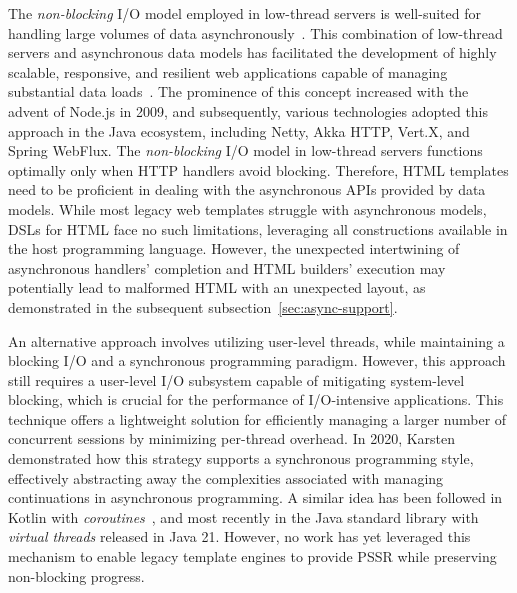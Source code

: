 The \textit{non-blocking} I/O model employed in low-thread servers is
well-suited for handling large volumes of data asynchronously~\cite{Meijer12}.
This combination of low-thread servers and asynchronous data models has
facilitated the development of highly scalable, responsive, and resilient web
applications capable of managing substantial data loads~\cite{Jin15}.
The prominence of this concept increased with the advent of Node.js in
2009, and subsequently, various technologies adopted this approach
in the Java ecosystem, including Netty, Akka HTTP, Vert.X, and Spring WebFlux.
The \textit{non-blocking} I/O model in low-thread servers functions optimally
only when HTTP handlers avoid blocking.
Therefore, HTML templates need to be proficient in dealing with the asynchronous
APIs provided by data models.
While most legacy web templates struggle with asynchronous models, DSLs for HTML
face no such limitations, leveraging all constructions available in the host
programming language.
However, the unexpected intertwining of asynchronous handlers' completion and
HTML builders' execution may potentially lead to malformed HTML with an
unexpected layout, as demonstrated in the subsequent subsection~\ref{sec:async-support}.

An alternative approach involves utilizing user-level threads, while maintaining
a blocking I/O and a synchronous programming paradigm.
However, this approach still requires a user-level I/O subsystem capable of
mitigating system-level blocking, which is crucial for the performance of
I/O-intensive applications. This technique offers a lightweight solution for
efficiently managing a larger number of concurrent sessions by minimizing
per-thread overhead.
In 2020, Karsten~\cite{karsten2020} demonstrated how this strategy supports a
synchronous programming style, effectively abstracting away the complexities
associated with managing continuations in asynchronous programming.
A similar idea has been followed in Kotlin with
\textit{coroutines}~\cite{elizarov2021coroutines}, and most recently in the Java
standard library with \textit{virtual threads} released in Java 21.
However, no work has yet leveraged this mechanism to enable legacy template
engines to provide PSSR while preserving non-blocking progress.

